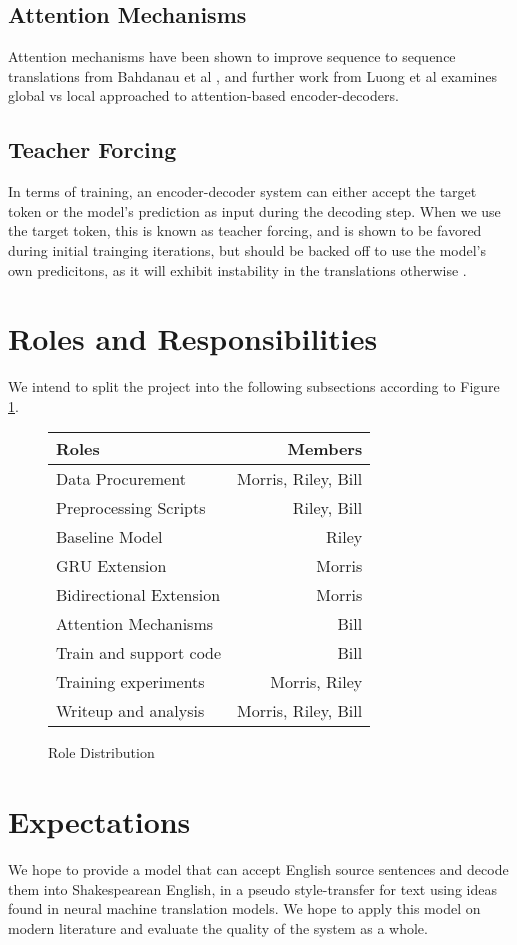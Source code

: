 \documentclass[twoside,twocolumn]{article}
\begin{document}
\subsection{Attention Mechanisms}
Attention mechanisms have been shown to improve sequence to sequence translations from Bahdanau et al \cite{bahdanau2014neural}, and further work from Luong et al \cite{luong2015effective} examines global vs local approached to attention-based encoder-decoders.
\subsection{Teacher Forcing}
In terms of training, an encoder-decoder system can either accept the target token or the model's prediction as input during the decoding step. When we use the target token, this is known as teacher forcing, and is shown to be favored during initial trainging iterations, but should be backed off to use the model's own predicitons, as it will exhibit instability in the translations otherwise \cite{lamb2016professor}.

\section{Roles and Responsibilities}
We intend to split the project into the following subsections according to Figure \ref{fig:roles}.

\begin{figure}
  \centering
  \begin{tabular}{ |l|r| }
      \hline
      \textbf{Roles} & \textbf{Members} \\
      \hline
      Data Procurement & Morris, Riley, Bill \\ \hline
      Preprocessing Scripts & Riley, Bill \\ \hline
      Baseline Model & Riley \\ \hline
      GRU Extension & Morris \\ \hline
      Bidirectional Extension & Morris \\ \hline
      Attention Mechanisms & Bill \\ \hline
      Train and support code & Bill \\ \hline
      Training experiments & Morris, Riley \\ \hline
      Writeup and analysis & Morris, Riley, Bill \\ \hline
  \end{tabular}
  \caption{Role Distribution}
  \label{fig:roles}
\end{figure}

\section{Expectations}
We hope to provide a model that can accept English source sentences and decode them into Shakespearean English, in a pseudo style-transfer for text using ideas found in neural machine translation models. We hope to apply this model on modern literature and evaluate the quality of the system as a whole.



\end{document}
